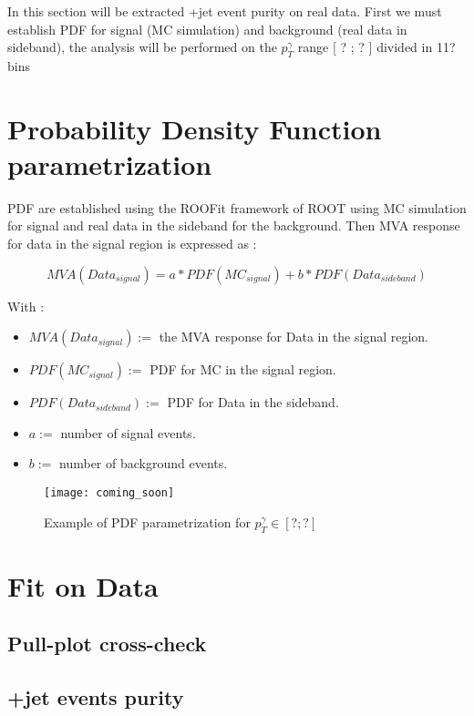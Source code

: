 \label{sec:unchapitre}

In this section will be extracted \textgamma+jet event purity on real data.
First we must establish PDF for signal (MC simulation) and background (real data in sideband), the analysis will be
performed on the $p_T^\gamma$ range [ ? ; ? ] divided in 11? bins

\section{Probability Density Function parametrization}

PDF are established using the ROOFit framework of ROOT using MC simulation for signal and real data in the sideband for the background.
Then MVA response for data in the signal region is expressed as : 

\begin{equation}
MVA(Data_{signal}) = a*PDF(MC_{signal}) + b*PDF(Data_{sideband})
\end{equation}

With : 
\begin{itemize}
	\item $MVA(Data_{signal}) :=$ the MVA response for Data in the signal region.
	\item $PDF(MC_{signal}) :=$ PDF for MC in the signal region.
	\item $PDF(Data_{sideband}) :=$ PDF for Data in the sideband. 
	\item $a :=$ number of signal events.
	\item $b :=$ number of background events. 
\end{itemize}

\begin{figure}[h!]
\centering
    \texttt{[image: coming\_soon]}
    \caption{Example of PDF parametrization for $p_T^\gamma \in [ ?;? ]$}
    \label{coming_soon}
\end{figure}

\section{Fit on Data}


\subsection{Pull-plot cross-check}

\subsection{\textgamma+jet events purity}


